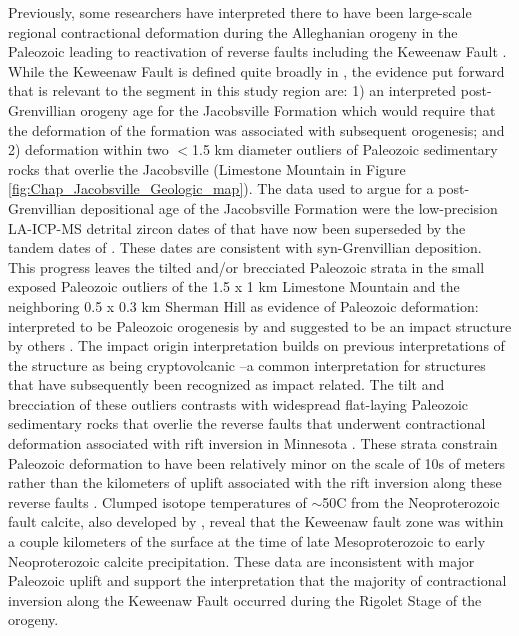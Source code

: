 Previously, some researchers have interpreted there to have been large-scale regional contractional deformation during the Alleghanian orogeny in the Paleozoic leading to reactivation of reverse faults including the Keweenaw Fault \citep{Craddock2017a}. While the Keweenaw Fault is defined quite broadly in \cite{Craddock2017a}, the evidence put forward that is relevant to the segment in this study region are: 1) an interpreted post-Grenvillian orogeny age for the Jacobsville Formation which would require that the deformation of the formation was associated with subsequent orogenesis; and 2) deformation within two $<$1.5 km diameter outliers of Paleozoic sedimentary rocks that overlie the Jacobsville (Limestone Mountain in Figure \ref{fig:Chap_Jacobsville_Geologic_map}). The data used to argue for a post-Grenvillian depositional age of the Jacobsville Formation were the low-precision LA-ICP-MS detrital zircon dates of \cite{Malone2016a} that have now been superseded by the tandem dates of \cite{Hodgin2022a}. These dates are consistent with syn-Grenvillian deposition. This progress leaves the tilted and/or brecciated Paleozoic strata in the small exposed Paleozoic outliers of the 1.5 x 1 km Limestone Mountain and the neighboring 0.5 x 0.3 km Sherman Hill as evidence of Paleozoic deformation: interpreted to be Paleozoic orogenesis by \cite{Hamblin1958a, Craddock2017a} and suggested to be an impact structure by others \citep{Milstein1987a}. The impact origin interpretation builds on previous interpretations of the structure as being cryptovolcanic \citep{Cannon1981a}--a common interpretation for structures that have subsequently been recognized as impact related. The tilt and brecciation of these outliers contrasts with widespread flat-laying Paleozoic sedimentary rocks that overlie the reverse faults that underwent contractional deformation associated with rift inversion in Minnesota \citep{Jirsa2011a}. These strata constrain Paleozoic deformation to have been relatively minor on the scale of 10s of meters rather than the kilometers of uplift associated with the rift inversion along these reverse faults \citep{Boerboom2018a}. Clumped isotope temperatures of $\sim$50\textdegree C from the Neoproterozoic fault calcite, also developed by \cite{Hodgin2022a}, reveal that the Keweenaw fault zone was within a couple kilometers of the surface at the time of late Mesoproterozoic to early Neoproterozoic calcite precipitation. These data are inconsistent with major Paleozoic uplift and support the interpretation that the majority of contractional inversion along the Keweenaw Fault occurred during the Rigolet Stage of the orogeny. 

